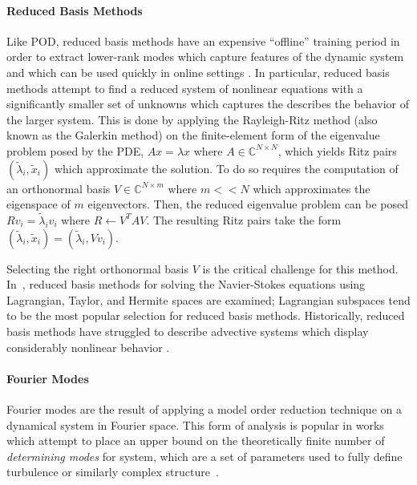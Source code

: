 \paragraph{Reduced Basis Methods} Like POD, reduced basis methods have an expensive ``offline'' training period in order to extract lower-rank modes which capture features of the dynamic system and which can be used quickly in online settings \autocite{ohlberger2015reduced}. In particular, reduced basis methods attempt to find a reduced system of nonlinear equations with a significantly smaller set of unknowns which captures the describes the behavior of the larger system. This is done by applying the Rayleigh-Ritz method (also known as the Galerkin method) on the finite-element form of the eigenvalue problem posed by the PDE, $Ax = \lambda x$ where $A\in\mathbb{C}^{N\times N}$, which yields Ritz pairs $(\tilde{\lambda}_i, \tilde{x}_i)$ which approximate the solution\autocite{noor1980reduced}. To do so requires the computation of an orthonormal basis $V \in \mathbb{C}^{N\times m}$ where $m << N$ which approximates the eigenspace of $m$ eigenvectors.
Then, the reduced eigenvalue problem can be posed $Rv_i = \tilde{\lambda}_iv_i$ where $R \longleftarrow V^TAV$. The resulting Ritz pairs take the form $(\tilde{\lambda}_i, \tilde{x}_i) = (\tilde{\lambda}_i, Vv_i)$.

Selecting the right orthonormal basis $V$ is the critical challenge for this method. In~\cite{quarteroni2007numerical}, reduced basis methods for solving the Navier-Stokes equations using Lagrangian, Taylor, and Hermite spaces are examined; Lagrangian subspaces tend to be the most popular selection for reduced basis methods. Historically, reduced basis methods have struggled to describe advective systems which display considerably nonlinear behavior \autocite{quarteroni2007numerical,ohlberger2015reduced}.

\paragraph{Fourier Modes} Fourier modes are the result of applying a model order reduction technique on a dynamical system in Fourier space. This form of analysis is popular in works which attempt to place an upper bound on the theoretically finite number of \emph{determining modes} for system, which are a set of parameters used to fully define turbulence or similarly complex structure~\cite{jones1993upper}.

